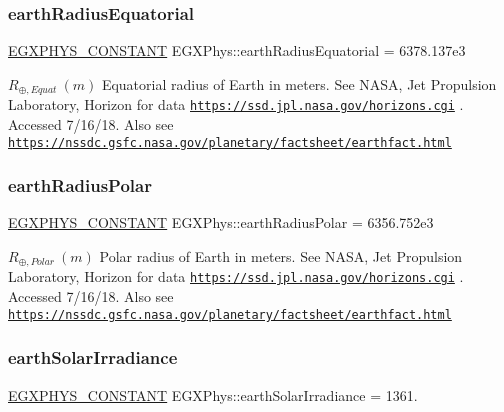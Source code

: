 \subsubsection{\texorpdfstring{earth\+Radius\+Equatorial}{earthRadiusEquatorial}}
{\footnotesize\ttfamily \mbox{\hyperlink{group___e_g_x_phys-_constants-_macros_ga76980d288494ce1714c9ac68a95ba702}{E\+G\+X\+P\+H\+Y\+S\+\_\+\+C\+O\+N\+S\+T\+A\+NT}} E\+G\+X\+Phys\+::earth\+Radius\+Equatorial = 6378.\+137e3}

$R_{\oplus,Equat} \ (m)$ Equatorial radius of Earth in meters. See N\+A\+SA, Jet Propulsion Laboratory, Horizon for data \href{https://ssd.jpl.nasa.gov/horizons.cgi}{\tt https\+://ssd.\+jpl.\+nasa.\+gov/horizons.\+cgi} . Accessed 7/16/18. Also see \href{https://nssdc.gsfc.nasa.gov/planetary/factsheet/earthfact.html}{\tt https\+://nssdc.\+gsfc.\+nasa.\+gov/planetary/factsheet/earthfact.\+html} \mbox{\label{group___e_g_x_phys-_constants-_astrophysics-_solar_system-_earth-_bulk_gaa5213443d0c8577a2bfef89193346764}} 
\subsubsection{\texorpdfstring{earth\+Radius\+Polar}{earthRadiusPolar}}
{\footnotesize\ttfamily \mbox{\hyperlink{group___e_g_x_phys-_constants-_macros_ga76980d288494ce1714c9ac68a95ba702}{E\+G\+X\+P\+H\+Y\+S\+\_\+\+C\+O\+N\+S\+T\+A\+NT}} E\+G\+X\+Phys\+::earth\+Radius\+Polar = 6356.\+752e3}

$R_{\oplus,Polar} \ (m)$ Polar radius of Earth in meters. See N\+A\+SA, Jet Propulsion Laboratory, Horizon for data \href{https://ssd.jpl.nasa.gov/horizons.cgi}{\tt https\+://ssd.\+jpl.\+nasa.\+gov/horizons.\+cgi} . Accessed 7/16/18. Also see \href{https://nssdc.gsfc.nasa.gov/planetary/factsheet/earthfact.html}{\tt https\+://nssdc.\+gsfc.\+nasa.\+gov/planetary/factsheet/earthfact.\+html} \mbox{\label{group___e_g_x_phys-_constants-_astrophysics-_solar_system-_earth-_bulk_ga24723f27199b46aa1ad76d93bbe93b11}} 
\subsubsection{\texorpdfstring{earth\+Solar\+Irradiance}{earthSolarIrradiance}}
{\footnotesize\ttfamily \mbox{\hyperlink{group___e_g_x_phys-_constants-_macros_ga76980d288494ce1714c9ac68a95ba702}{E\+G\+X\+P\+H\+Y\+S\+\_\+\+C\+O\+N\+S\+T\+A\+NT}} E\+G\+X\+Phys\+::earth\+Solar\+Irradiance = 1361.}

